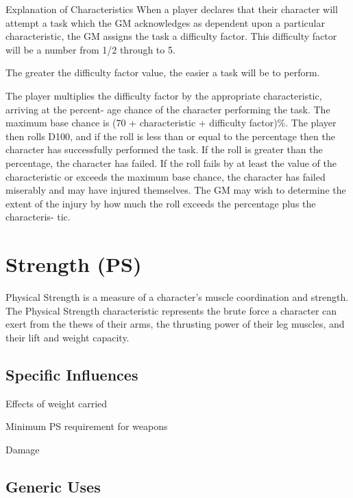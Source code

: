 \begin{Chapter}{Explanation of Characteristics}
When a player declares that their character will attempt a task which
the GM acknowledges as dependent upon a particular characteristic, the
GM assigns the task a difficulty factor.  This difficulty factor will
be a number from 1/2 through to 5.

The greater the difficulty factor value, the easier a task will be to
perform.

The player multiplies the difficulty factor by the appropriate
characteristic, arriving at the percent- age chance of the character
performing the task.  The maximum base chance is (70 + characteristic
+ difficulty factor)\%.  The player then rolls D100, and if the roll
is less than or equal to the percentage then the character has
successfully performed the task.  If the roll is greater than the
percentage, the character has failed.  If the roll fails by at least
the value of the characteristic or exceeds the maximum base chance,
the character has failed miserably and may have injured themselves.
The GM may wish to determine the extent of the injury by how much the
roll exceeds the percentage plus the characteris- tic.


\section{Strength (PS)}

Physical Strength is a measure of a character’s muscle coordination
and strength.  The Physical Strength characteristic represents the
brute force a character can exert from the thews of their arms, the
thrusting power of their leg muscles, and their lift and weight
capacity.

\subsection{Specific Influences}


\begin{Itemize}

\item Effects of weight carried  

\item Minimum PS requirement for weapons

\item Damage 

\end{Itemize}

\subsection{Generic Uses}


\end{Chapter}
